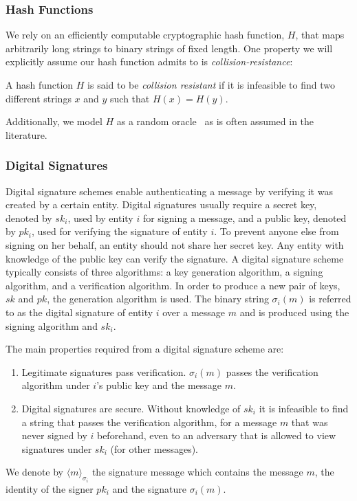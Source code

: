 \subsubsection*{Hash Functions}
\label{Hash_Functions}
We rely on an efficiently computable cryptographic hash function, $H$, that maps arbitrarily long strings to binary strings of fixed length. One property we will explicitly assume our hash function admits to is \textit{collision-resistance}:
\begin{definition}
	A hash function $H$ is said to be \emph{collision resistant} if it is infeasible to find two different strings $x$ and $y$ such that $H(x)=H(y)$.
\end{definition}
\noindent Additionally, we model $H$ as a random oracle~\cite{RandomOracleModel} as is often assumed in the literature.


\subsubsection*{Digital Signatures}
\label{Digital_Signatures}
Digital signature schemes enable authenticating a message by verifying it was created by a certain entity.
Digital signatures usually require a secret key, denoted by $sk_i$, used by entity $i$ for signing a message, and a public key, denoted by $pk_i$, used for verifying the signature of entity $i$. To prevent anyone else from signing on her behalf, an entity should not share her secret key. Any entity with knowledge of the public key can verify the signature. 
A digital signature scheme typically consists of three algorithms: a key generation algorithm, a signing algorithm, and a verification algorithm.
In order to produce a new pair of keys, $sk$ and $pk$, the generation algorithm is used. The binary string $\sigma_{i}(m)$ is referred to as the digital signature of entity $i$ over a message $m$ and is produced using the signing algorithm and $sk_i$.

The main properties required from a digital signature scheme are:
\begin{enumerate}
\item Legitimate signatures pass verification. $\sigma_i(m)$ passes the verification algorithm under $i$'s public key and the message $m$.
\item Digital signatures are secure. Without knowledge of $sk_i$ it is infeasible to find a string that passes the verification algorithm, for a message $m$ that was never signed by $i$ beforehand, even to an adversary that is allowed to view signatures under $sk_i$ (for other messages).
\end{enumerate}
\noindent We denote by $\langle m \rangle_{\sigma_i}$ the signature message which contains the message $m$, the identity of the signer $pk_i$ and the signature $\sigma_i(m)$.